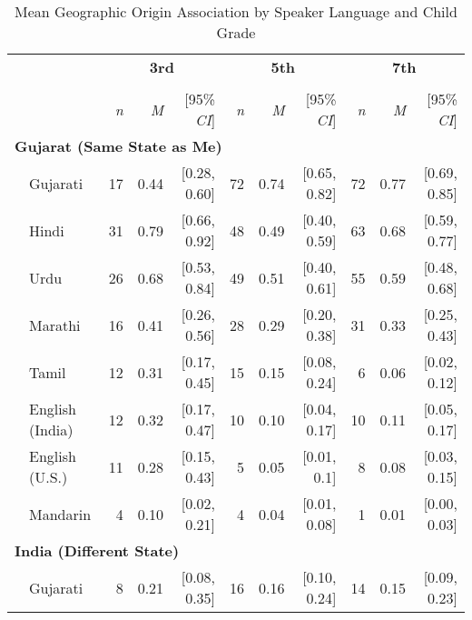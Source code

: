 \begin{table}[h!]
 \centering
\caption{Mean Geographic Origin Association by Speaker Language and Child Grade}
\begin{footnotesize}
\renewcommand{\tabcolsep}{0.15cm}
\label{tab:geographic-origins-means}
\begin{tabular}{p{.1in}lrrrrrrrrr}
\toprule
 &  & \multicolumn{3}{c}{\textbf{3rd}} & \multicolumn{3}{c}{\textbf{5th}} & \multicolumn{3}{c}{\textbf{7th}} \\
\cline{3-5} \cline{6-8} \cline{9-11}\\[-.75em]
&  & \textit{n} & \textit{M} & [95\% \textit{CI}] &  \textit{n} & \textit{M} & [95\% \textit{CI}] &  \textit{n}  & \textit{M} & [95\% \textit{CI}]\\
\midrule
\multicolumn{11}{l}{\textbf{Gujarat (Same State as Me)}}\\
 & Gujarati & 17 & 0.44 & [0.28, 0.60] & 72 & 0.74 & [0.65, 0.82] & 72 & 0.77 & [0.69, 0.85]\\

 & Hindi & 31 & 0.79 & [0.66, 0.92] & 48 & 0.49 & [0.40, 0.59] & 63 & 0.68 & [0.59, 0.77]\\

 & Urdu & 26 & 0.68 & [0.53, 0.84] & 49 & 0.51 & [0.40, 0.61] & 55 & 0.59 & [0.48, 0.68]\\

 & Marathi & 16 & 0.41 & [0.26, 0.56] & 28 & 0.29 & [0.20, 0.38] & 31 & 0.33 & [0.25, 0.43]\\

 & Tamil & 12 & 0.31 & [0.17, 0.45] & 15 & 0.15 & [0.08, 0.24] & 6 & 0.06 & [0.02, 0.12]\\

 & English (India) & 12 & 0.32 & [0.17, 0.47] & 10 & 0.10 & [0.04, 0.17] & 10 & 0.11 & [0.05, 0.17]\\

 & English (U.S.) & 11 & 0.28 & [0.15, 0.43] & 5 & 0.05 & [0.01, 0.1] & 8 & 0.08 & [0.03, 0.15]\\

& Mandarin & 4 & 0.10 & [0.02, 0.21] & 4 & 0.04 & [0.01, 0.08] & 1 & 0.01 & [0.00, 0.03]\\

\midrule
\multicolumn{11}{l}{\textbf{India (Different State)}}\\
  & Gujarati & 8 & 0.21 & [0.08, 0.35] & 16 & 0.16 & [0.10, 0.24] & 14 & 0.15 & [0.09, 0.23]\\


\end{tabular}
\end{footnotesize}
\end{table}
